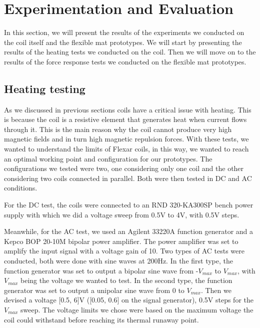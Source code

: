 \section{Experimentation and Evaluation}
In this section, we will present the results of the experiments we conducted on the coil itself and the flexible mat prototypes.
We will start by presenting the results of the heating tests we conducted on the coil.
Then we will move on to the results of the force response tests we conducted on the flexible mat prototypes.

\subsection{Heating testing}
As we discussed in previous sections coils have a critical issue with heating.
This is because the coil is a resistive element that generates heat when current flows through it.
This is the main reason why the coil cannot produce very high magnetic fields and in turn high magnetic repulsion forces.
With these tests, we wanted to understand the limits of Flexar coils, in this way, we wanted to reach an optimal working point and configuration for our prototypes.
The configurations we tested were two, one considering only one coil and the other considering two coils connected in parallel.
Both were then tested in DC and AC conditions.

For the DC test, the coils were connected to an RND 320-KA300SP bench power supply with which we did a voltage sweep from 0.5V to 4V, with 0.5V steps.

Meanwhile, for the AC test, we used an Agilent 33220A function generator and a Kepco BOP 20-10M bipolar power amplifier.
The power amplifier was set to amplify the input signal with a voltage gain of 10. 
Two types of AC tests were conducted, both were done with sine waves at 200Hz.
In the first type, the function generator was set to output a bipolar sine wave from -$V_{max}$ to $V_{max}$, with $V_{max}$ being the voltage we wanted to test.
In the second type, the function generator was set to output a unipolar sine wave from 0 to $V_{max}$.
Then we devised a voltage [0.5, 6]V ([0.05, 0.6] on the signal generator), 0.5V steps for the $V_{max}$ sweep.
The voltage limits we chose were based on the maximum voltage the coil could withstand before reaching its thermal runaway point.

